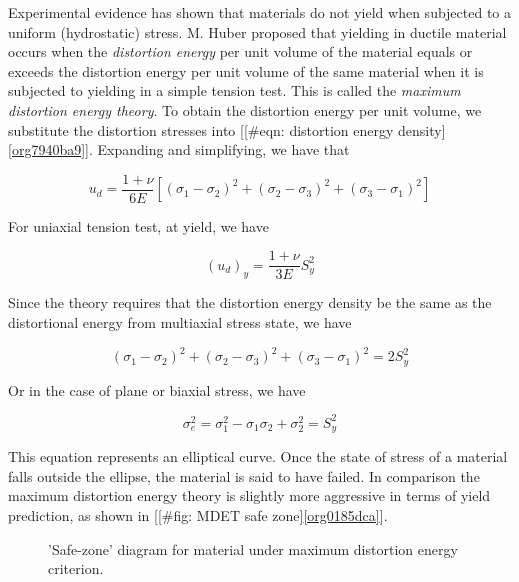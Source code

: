 \documentclass[a4paper,openany,12pt]{book}
\begin{document}
Experimental evidence has shown that materials do not yield when
subjected to a uniform (hydrostatic) stress. M. Huber proposed that
yielding in ductile material occurs when the \emph{distortion energy} per
unit volume of the material equals or exceeds the distortion energy per
unit volume of the same material when it is subjected to yielding in a
simple tension test. This is called the \emph{maximum distortion energy
theory}. To obtain the distortion energy per unit volume, we substitute
the distortion stresses into
[[\#eqn: distortion energy density]\ref{org7940ba9}].
Expanding and simplifying, we have that

$$u_d = \frac{1 + \nu}{6E}\left[ (\sigma_1 - \sigma_2)^2 + (\sigma _2 - \sigma_3)^2 + (\sigma_3 - \sigma_1)^2 \right]$$

For uniaxial tension test, at yield, we have

$$(u_d)_y = \frac{1 + \nu}{3E}S_y^2$$

Since the theory requires that the distortion energy density be the same
as the distortional energy from multiaxial stress state, we have

$$(\sigma_1 - \sigma_2)^2 + (\sigma_2 - \sigma_3)^2 + (\sigma_3 - \sigma_1)^2 = 2S_y^2$$

Or in the case of plane or biaxial stress, we have

$$\sigma_e^2 = \sigma_1^2 - \sigma_1\sigma_2 + \sigma_2^2 = S_y^2$$

This equation represents an elliptical curve. Once the state of stress
of a material falls outside the ellipse, the material is said to have
failed. In comparison the maximum distortion energy theory is slightly
more aggressive in terms of yield prediction, as shown in
[[\#fig: MDET safe zone]\ref{org0185dca}].

\begin{figure}[h]
  \centering
  \caption{'Safe-zone' diagram for material under maximum distortion energy criterion.}
  \label{fig: MDET safe zone}
\end{figure}
\end{document}
